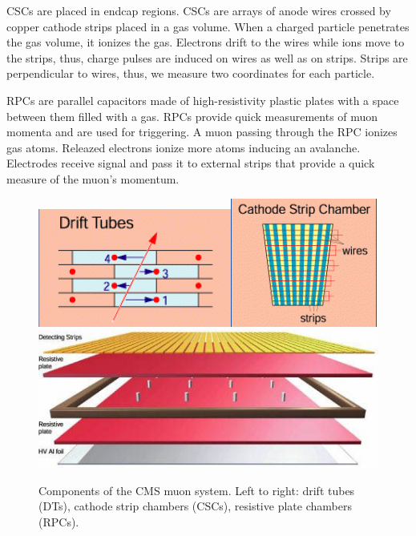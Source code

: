CSCs are placed in endcap regions. CSCs are arrays of anode wires crossed by copper cathode strips placed in a gas volume. When a charged particle penetrates the gas volume, it ionizes the gas. Electrons drift to the wires while ions move to the strips, thus, charge pulses are induced on wires as well as on strips. Strips are perpendicular to wires, thus, we measure two coordinates for each particle.  

RPCs are parallel capacitors made of high-resistivity plastic plates with a space between them filled with a gas. RPCs provide quick measurements of muon momenta and are used for triggering. A muon passing through the RPC ionizes gas atoms. Releazed electrons ionize more atoms inducing an avalanche. Electrodes receive signal and pass it to external strips that provide a quick measure of the muon's momentum. 


\begin{figure}[htb]
  \begin{center}
    \includegraphics[height=2.5 cm]{../figs/Exp/muonSystem_driftTubes.png}\quad\includegraphics[height=2.5 cm]{../figs/Exp/muonSystem_CSC.png}\quad\includegraphics[height=2.5 cm]{../figs/Exp/muonSystem_RPC.png}
    \caption{Components of the CMS muon system. Left to right: drift tubes (DTs), cathode strip chambers (CSCs), resistive plate chambers (RPCs).}
    \label{fig:muonSystem}
  \end{center}
\end{figure}


